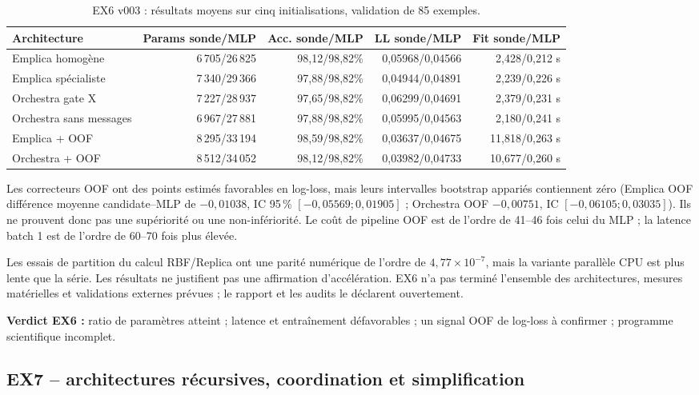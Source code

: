 \documentclass[11pt,a4paper]{article}
\begin{document}
\begin{table}[H]
\centering\small
\caption{EX6 v003 : résultats moyens sur cinq initialisations, validation de 85 exemples.}
\begin{tabularx}{\textwidth}{Xrrrr}
\toprule
Architecture & Params sonde/MLP & Acc. sonde/MLP & LL sonde/MLP & Fit sonde/MLP\\
\midrule
Emplica homogène & 6\,705/26\,825 & 98,12/98,82\% & 0,05968/0,04566 & 2,428/0,212 s\\
Emplica spécialiste & 7\,340/29\,366 & 97,88/98,82\% & 0,04944/0,04891 & 2,239/0,226 s\\
Orchestra gate X & 7\,227/28\,937 & 97,65/98,82\% & 0,06299/0,04691 & 2,379/0,231 s\\
Orchestra sans messages & 6\,967/27\,881 & 97,88/98,82\% & 0,05995/0,04563 & 2,180/0,241 s\\
Emplica + OOF & 8\,295/33\,194 & 98,59/98,82\% & 0,03637/0,04675 & 11,818/0,263 s\\
Orchestra + OOF & 8\,512/34\,052 & 98,12/98,82\% & 0,03982/0,04733 & 10,677/0,260 s\\
\bottomrule
\end{tabularx}
\end{table}

Les correcteurs OOF ont des points estimés favorables en log-loss, mais leurs intervalles bootstrap appariés contiennent zéro (Emplica OOF différence moyenne candidate--MLP de \(-0,01038\), IC 95\,\% \([-0,05569;0,01905]\) ; Orchestra OOF \(-0,00751\), IC \([-0,06105;0,03035]\)). Ils ne prouvent donc pas une supériorité ou une non-infériorité. Le coût de pipeline OOF est de l'ordre de 41--46 fois celui du MLP ; la latence batch 1 est de l'ordre de 60--70 fois plus élevée.

Les essais de partition du calcul RBF/Replica ont une parité numérique de l'ordre de \(4,77\times10^{-7}\), mais la variante parallèle CPU est plus lente que la série. Les résultats ne justifient pas une affirmation d'accélération. EX6 n'a pas terminé l'ensemble des architectures, mesures matérielles et validations externes prévues ; le rapport et les audits le déclarent ouvertement.

\textbf{Verdict EX6 :} ratio de paramètres atteint ; latence et entraînement défavorables ; un signal OOF de log-loss à confirmer ; programme scientifique incomplet.

\subsection{EX7 -- architectures récursives, coordination et simplification}
\end{document}
